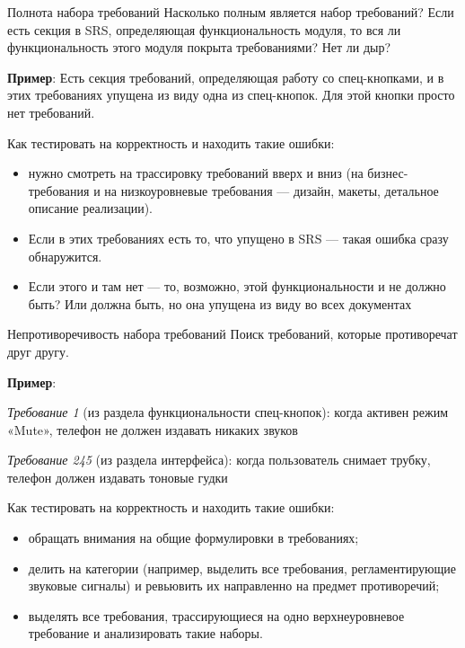 \documentclass{beamer}
\begin{document}
\begin{frame}[t]{Полнота набора требований}
Насколько полным является набор требований? Если есть секция в SRS, определяющая функциональность
модуля, то вся ли функциональность этого модуля покрыта требованиями? Нет ли дыр?

\textbf{Пример}: Есть секция требований, определяющая работу со спец-кнопками, и в этих
требованиях упущена из виду одна из спец-кнопок. Для этой кнопки просто нет требований.

Как тестировать на корректность и находить такие ошибки:
\begin{itemize}
\item нужно смотреть на трассировку требований вверх и вниз (на бизнес-требования и на низкоуровневые
требования — дизайн, макеты, детальное описание реализации). 
\item Если в этих требованиях есть то, что упущено в SRS — такая ошибка сразу обнаружится. 
\item Если этого и там нет — то, возможно, этой функциональности и не должно быть? Или должна быть, но она упущена из виду во всех документах
\end{itemize}
\end{frame}

\begin{frame}[t]{Непротиворечивость набора требований }
Поиск требований, которые противоречат друг другу. 

\textbf{Пример}: 

\textit{Требование 1} (из раздела функциональности спец-кнопок): когда активен режим «Mute», телефон не должен издавать никаких звуков

\textit{Требование 245} (из раздела интерфейса): когда пользователь снимает трубку, телефон должен издавать тоновые гудки

Как тестировать на корректность и находить такие ошибки:
\begin{itemize}
\item обращать внимания на общие формулировки в требованиях; 
\item делить на категории (например, выделить все требования, регламентирующие
звуковые сигналы) и ревьювить их направленно на предмет противоречий;
\item выделять все требования, трассирующиеся на одно верхнеуровневое требование
и анализировать такие наборы. 
\end{itemize}
\end{frame}
\end{document}
